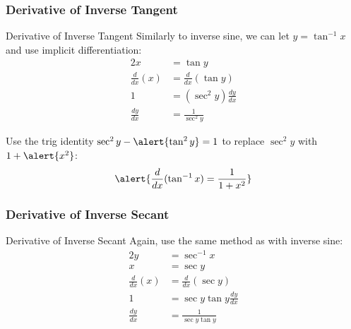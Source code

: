 \documentclass[cal1spr16Lectures.tex]{subfiles}
\begin{document}
\subsubsection{Derivative of Inverse Tangent}

\begin{frame}{\small Derivative of Inverse Tangent}\footnotesize
Similarly to inverse sine, we can let $y=\tan^{-1}x$ and use implicit differentiation:
\vspace{-0.5pc}
\begin{alignat*}{2}
x &= \tan y \\
\frac{d}{dx}(x) &= \frac{d}{dx} (\tan y) \\
1 &= (\sec^2 y) \frac{dy}{dx} \\
\frac{dy}{dx} &= \frac{1}{\sec^2 y}
\end{alignat*}
\end{frame}

\begin{frame}
Use the trig identity $\sec^2 y-\alert{\tan^2 y}=1$ to replace $\sec^2 y$ with $1+\alert{x^2}$:
\[\alert{\frac{d}{dx}(\tan^{-1} x)=\frac{1}{1+x^2}}\]
\end{frame}

\subsubsection{Derivative of Inverse Secant}

\begin{frame}{\small Derivative of Inverse Secant}\footnotesize
Again, use the same method as with inverse sine:
\begin{alignat*}{2}
y &= \sec^{-1}x \\
x &= \sec y \\
\frac{d}{dx}(x) &= \frac{d}{dx} (\sec y) \\
1 &= \sec y \tan y \frac{dy}{dx} \\
\frac{dy}{dx} &= \frac{1}{\sec y \tan y}
\end{alignat*}
\end{frame}
\end{document}
